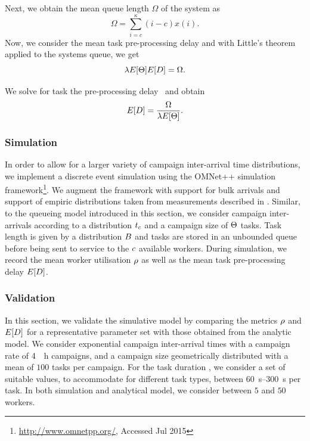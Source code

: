 Next, we obtain the mean queue length \(\Omega\) of the system as
\[
	\Omega = \sum_{i = c}^\kappa (i - c) x(i).
\]
Now, we consider the mean task pre-processing delay and with Little's theorem applied to the systems queue, we get
\[\lambda E[\Theta] E[D] = \Omega.\]

We solve for task the pre-processing delay \preTaskProcessingDelay~and obtain
\[E[D] = \frac{\Omega}{\lambda E[\Theta]}.\]

\subsubsection*{Simulation}

In order to allow for a larger variety of campaign inter-arrival time distributions, we implement a discrete event simulation using the OMNet++ simulation framework\footnote{\url{http://www.omnetpp.org/}, Accessed Jul 2015}.
We augment the framework with support for bulk arrivals and support of empiric distributions taken from measurements described in .
Similar, to the queueing model introduced in this section, we consider campaign inter-arrivals according to a distribution \(t_c\) and a campaign size of \(\Theta\) tasks.
Task length is given by a distribution \(B\) and tasks are stored in an unbounded queue before being sent to service to the \(c\) available workers.
During simulation, we record the mean worker utilisation \(\rho\) as well as the mean task pre-processing delay \(E[D]\).

\subsubsection*{Validation}

In this section, we validate the simulative model by comparing the metrics \(\rho\) and \(E[D]\) for a representative parameter set with those obtained from the analytic model.
We consider exponential campaign inter-arrival times with a campaign rate of \SI{4}{\per\hour} campaigns, and a campaign size \campaignSize geometrically distributed with a mean of \(100\) tasks per campaign.
For the task duration \taskDuration, we consider a set of suitable values, to accommodate for different task types, between \SIrange{60}{300}{\second} per task.
In both simulation and analytical model, we consider between \(5\) and \(50\) workers.

